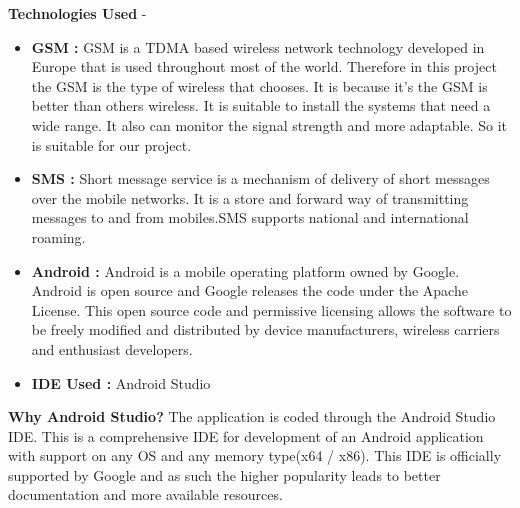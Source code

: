 \textbf{\hspace{0.9cm} Technologies Used} - 
	\begin{itemize}
	\item \textbf{GSM : } GSM is a TDMA based wireless
	network technology developed in Europe that is used
	throughout most of the world. Therefore in this project
	the GSM is the type of wireless that chooses. It is
	because it's the GSM is better than others wireless. It
	is suitable to install the systems that need a wide
	range. It also can monitor the signal strength and more
	adaptable. So it is suitable for our project. 
	\item \textbf{SMS : } Short message service is a mechanism
	of delivery of short messages over the mobile
	networks. It is a store and forward way of transmitting
	messages to and from mobiles.SMS supports national
	and international roaming. 
	\item \textbf{Android : }Android is a mobile operating
	platform owned by Google. Android is open source
	and Google releases the code under the Apache
	License. This open source code and permissive
	licensing allows the software to be freely modified
	and distributed by device manufacturers, wireless
	carriers and enthusiast developers. 
	\item \textbf{IDE Used : } Android Studio
\end{itemize}
\textbf{Why Android Studio? } The application is coded through the Android Studio IDE.
This is a comprehensive IDE for development of an
Android application with support on any OS and any
memory type(x64 / x86). This IDE is officially supported by Google and as such the higher popularity leads to better documentation and more available resources.
\newpage

